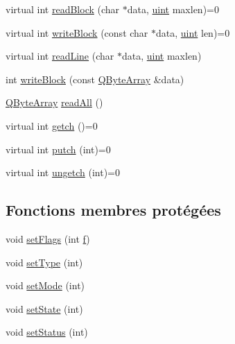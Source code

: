 \begin{DoxyCompactItemize}
\item 
virtual int \hyperlink{class_q_i_o_device_a71f10647e4bd98141f45362b9a06983a}{read\+Block} (char $\ast$data, \hyperlink{qglobal_8h_a4d3943ddea65db7163a58e6c7e8df95a}{uint} maxlen)=0
\item 
virtual int \hyperlink{class_q_i_o_device_a5d937df1bde2f956872dd54e077807d1}{write\+Block} (const char $\ast$data, \hyperlink{qglobal_8h_a4d3943ddea65db7163a58e6c7e8df95a}{uint} len)=0
\item 
virtual int \hyperlink{class_q_i_o_device_a4dc865ffcb5b7896ff8f9a1d828e4c0e}{read\+Line} (char $\ast$data, \hyperlink{qglobal_8h_a4d3943ddea65db7163a58e6c7e8df95a}{uint} maxlen)
\item 
int \hyperlink{class_q_i_o_device_a17d3fa98dc9e5eab406a6fa728c4b656}{write\+Block} (const \hyperlink{qcstring_8h_ad6a390648110655c217fe072d45fbcf5}{Q\+Byte\+Array} \&data)
\item 
\hyperlink{qcstring_8h_ad6a390648110655c217fe072d45fbcf5}{Q\+Byte\+Array} \hyperlink{class_q_i_o_device_a2b93df374c6eea09c68a95cf99d66e6f}{read\+All} ()
\item 
virtual int \hyperlink{class_q_i_o_device_a7cef61d66023f9cda6b0912082bd19fc}{getch} ()=0
\item 
virtual int \hyperlink{class_q_i_o_device_a5de5c1c1cba7ca36ba93289e30cd3029}{putch} (int)=0
\item 
virtual int \hyperlink{class_q_i_o_device_aae3d67422103e8fc0411297b1d62c29a}{ungetch} (int)=0
\end{DoxyCompactItemize}
\subsection*{Fonctions membres protégées}
\begin{DoxyCompactItemize}
\item 
void \hyperlink{class_q_i_o_device_a9ce695e889efa9145e47195fcc765bf5}{set\+Flags} (int \hyperlink{060__command__switch_8tcl_af6830d2c644b45088ea8f1f74a46b778}{f})
\item 
void \hyperlink{class_q_i_o_device_a16f5a19e0d5dde3ba5e9672974d44b1a}{set\+Type} (int)
\item 
void \hyperlink{class_q_i_o_device_a9a8d9bf655a71b5821699a97a78be6be}{set\+Mode} (int)
\item 
void \hyperlink{class_q_i_o_device_ab8a455c1e81b3382c5db9a65ea70e615}{set\+State} (int)
\item 
void \hyperlink{class_q_i_o_device_a742d895b19b6809d67aa1643baf67639}{set\+Status} (int)
\end{DoxyCompactItemize}
